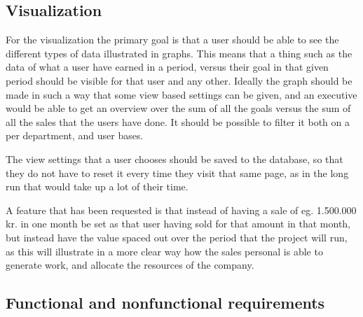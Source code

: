 \subsection{Visualization}
\label{sub:Visualization}
For the visualization the primary goal is that a user should be able to see the
different types of data illustrated in graphs. This means that a thing such as
the data of what a user have earned in a period, versus their goal in that given
period should be visible for that user and any other. Ideally the graph should
be made in such a way that some view based settings can be given, and an
executive would be able to get an overview over the sum of all the goals versus
the sum of all the sales that the users have done. It should be possible to
filter it both on a per department, and user bases. 

The view settings that a user chooses should be saved to the database, so that
they do not have to reset it every time they visit that same page, as in the
long run that would take up a lot of their time. 

A feature that has been requested is that instead of having a sale of eg. 1.500.000 kr. in one month be set as that user having sold for that amount in that month, but instead have the value spaced out over the period that the project will run, as this will illustrate in a more clear way how the sales personal is able to generate work, and allocate the resources of the company.

\subsection{Functional and nonfunctional requirements}
\label{sub:Functional and nonfunctional requirements}

